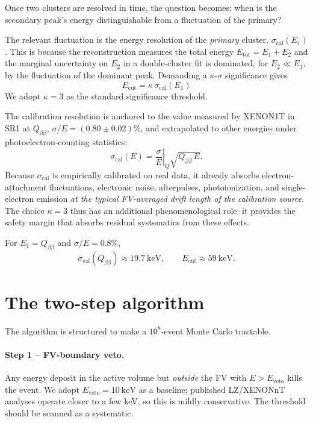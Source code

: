 \documentclass[11pt,a4paper]{article}
\begin{document}
Once two clusters are resolved in time, the question becomes: when
is the secondary peak's energy distinguishable from a fluctuation
of the primary?

The relevant fluctuation is the energy resolution of the
\emph{primary} cluster, $\sigma_{\mathrm{cal}}(E_1)$. This is because
the reconstruction measures the total energy
$E_{\mathrm{tot}} = E_1 + E_2$ and the marginal uncertainty on $E_2$
in a double-cluster fit is dominated, for $E_2 \ll E_1$, by the
fluctuation of the dominant peak. Demanding a $\kappa$-$\sigma$
significance gives
\begin{equation}
    \boxed{\;E_{\mathrm{cut}} = \kappa\,\sigma_{\mathrm{cal}}(E_1)\;}
    \label{eq:ecut}
\end{equation}
We adopt $\kappa = 3$ as the standard significance threshold.

The calibration resolution is anchored to the value measured by
XENON1T in SR1 at $Q_{\beta\beta}$, $\sigma/E = (0.80\pm 0.02)\%$,
and extrapolated to other energies under photoelectron-counting
statistics:
\begin{equation}
    \sigma_{\mathrm{cal}}(E) = \left.\frac{\sigma}{E}\right|_{Q}\!
    \sqrt{Q_{\beta\beta}\,E}.
    \label{eq:sigmacal}
\end{equation}
Because $\sigma_{\mathrm{cal}}$ is empirically calibrated on real
data, it already absorbs electron-attachment fluctuations,
electronic noise, afterpulses, photoionization, and single-electron
emission \emph{at the typical FV-averaged drift length of the
calibration source}. The choice $\kappa = 3$ thus has an additional
phenomenological role: it provides the safety margin that absorbs
residual systematics from these effects.

For $E_1 = Q_{\beta\beta}$ and $\sigma/E = 0.8\%$,
\begin{equation}
    \sigma_{\mathrm{cal}}(Q_{\beta\beta}) \approx \SI{19.7}{\keV},
    \qquad
    E_{\mathrm{cut}} \approx \SI{59}{\keV}.
\end{equation}

\section{The two-step algorithm}

The algorithm is structured to make a $10^{8}$-event Monte Carlo
tractable.

\paragraph{Step 1 -- FV-boundary veto.}
Any energy deposit in the active volume but \emph{outside} the FV
with $E > E_{\mathrm{veto}}$ kills the event. We adopt
$E_{\mathrm{veto}} = \SI{10}{\keV}$ as a baseline; published
LZ/XENONnT analyses operate closer to a few keV, so this is
mildly conservative. The threshold should be scanned as a systematic.
\end{document}
